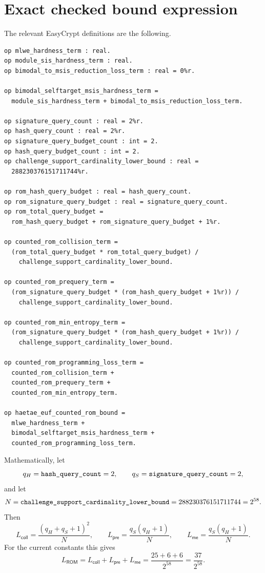 \section{Exact checked bound expression}
\label{sec:synthesis-exact-bound-expression}

The relevant EasyCrypt definitions are the following.

\begin{lstlisting}[language=EasyCrypt,caption={Checked bound definitions in \ec{HAETAE\_Reductions.ec}.},label={lst:haetae-reductions-bound-definitions}]
op mlwe_hardness_term : real.
op module_sis_hardness_term : real.
op bimodal_to_msis_reduction_loss_term : real = 0%r.

op bimodal_selftarget_msis_hardness_term =
  module_sis_hardness_term + bimodal_to_msis_reduction_loss_term.

op signature_query_count : real = 2%r.
op hash_query_count : real = 2%r.
op signature_query_budget_count : int = 2.
op hash_query_budget_count : int = 2.
op challenge_support_cardinality_lower_bound : real =
  288230376151711744%r.

op rom_hash_query_budget : real = hash_query_count.
op rom_signature_query_budget : real = signature_query_count.
op rom_total_query_budget =
  rom_hash_query_budget + rom_signature_query_budget + 1%r.

op counted_rom_collision_term =
  (rom_total_query_budget * rom_total_query_budget) /
    challenge_support_cardinality_lower_bound.

op counted_rom_prequery_term =
  (rom_signature_query_budget * (rom_hash_query_budget + 1%r)) /
    challenge_support_cardinality_lower_bound.

op counted_rom_min_entropy_term =
  (rom_signature_query_budget * (rom_hash_query_budget + 1%r)) /
    challenge_support_cardinality_lower_bound.

op counted_rom_programming_loss_term =
  counted_rom_collision_term +
  counted_rom_prequery_term +
  counted_rom_min_entropy_term.

op haetae_euf_counted_rom_bound =
  mlwe_hardness_term +
  bimodal_selftarget_msis_hardness_term +
  counted_rom_programming_loss_term.
\end{lstlisting}

Mathematically, let
\[
  q_H=\texttt{hash\_query\_count}=2,
  \qquad
  q_S=\texttt{signature\_query\_count}=2,
\]
and let
\[
  N=\texttt{challenge\_support\_cardinality\_lower\_bound}
   =288230376151711744=2^{58}.
\]
Then
\[
  L_{\mathsf{coll}}=\frac{(q_H+q_S+1)^2}{N},
  \qquad
  L_{\mathsf{pre}}=\frac{q_S(q_H+1)}{N},
  \qquad
  L_{\mathsf{me}}=\frac{q_S(q_H+1)}{N}.
\]
For the current constants this gives
\[
  L_{\mathsf{ROM}}
  =L_{\mathsf{coll}}+L_{\mathsf{pre}}+L_{\mathsf{me}}
  =\frac{25+6+6}{2^{58}}
  =\frac{37}{2^{58}}.
\]


